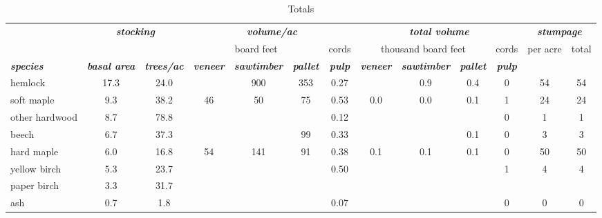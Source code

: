 \documentclass[landscape]{article}
\begin{document}
\begin{table}[H]

\caption{\label{tab:unnamed-chunk-37}Totals}
\fontsize{10}{12}\selectfont
\begin{tabular}[t]{lcccccccccccc}
\toprule
\multicolumn{1}{c}{\em{\textbf{ }}} & \multicolumn{2}{c}{\em{\textbf{stocking}}} & \multicolumn{4}{c}{\em{\textbf{volume/ac }}} & \multicolumn{4}{c}{\em{\textbf{total volume}}} & \multicolumn{2}{c}{\em{\textbf{stumpage}}} \\
\cmidrule(l{3pt}r{3pt}){2-3} \cmidrule(l{3pt}r{3pt}){4-7} \cmidrule(l{3pt}r{3pt}){8-11} \cmidrule(l{3pt}r{3pt}){12-13}
\multicolumn{3}{c}{ } & \multicolumn{3}{c}{board feet} & \multicolumn{1}{c}{cords} & \multicolumn{3}{c}{thousand board feet} & \multicolumn{1}{c}{cords} & \multicolumn{1}{c}{per acre} & \multicolumn{1}{c}{total} \\
\cmidrule(l{3pt}r{3pt}){4-6} \cmidrule(l{3pt}r{3pt}){7-7} \cmidrule(l{3pt}r{3pt}){8-10} \cmidrule(l{3pt}r{3pt}){11-11} \cmidrule(l{3pt}r{3pt}){12-12} \cmidrule(l{3pt}r{3pt}){13-13}
\rowcolor[HTML]{DCDCDC}  \em{\textbf{species}} & \em{\textbf{basal area}} & \em{\textbf{trees/ac}} & \em{\textbf{veneer}} & \em{\textbf{sawtimber}} & \em{\textbf{pallet}} & \em{\textbf{pulp}} & \em{\textbf{veneer}} & \em{\textbf{sawtimber}} & \em{\textbf{pallet}} & \em{\textbf{pulp}} & \em{\textbf{ }} & \em{\textbf{ }}\\
\midrule
\rowcolor{gray!6}  hemlock & 17.3 & 24.0 &  & 900 & 353 & 0.27 &  & 0.9 & 0.4 & 0 & 54 & 54\\
 
soft maple & 9.3 & 38.2 & 46 & 50 & 75 & 0.53 & 0.0 & 0.0 & 0.1 & 1 & 24 & 24\\
 
\rowcolor{gray!6}  other hardwood & 8.7 & 78.8 &  &  &  & 0.12 &  &  &  & 0 & 1 & 1\\
 
beech & 6.7 & 37.3 &  &  & 99 & 0.33 &  &  & 0.1 & 0 & 3 & 3\\
 
\rowcolor{gray!6}  hard maple & 6.0 & 16.8 & 54 & 141 & 91 & 0.38 & 0.1 & 0.1 & 0.1 & 0 & 50 & 50\\
 
yellow birch & 5.3 & 23.7 &  &  &  & 0.50 &  &  &  & 1 & 4 & 4\\
 
\rowcolor{gray!6}  paper birch & 3.3 & 31.7 &  &  &  &  &  &  &  &  &  & \\
 
ash & 0.7 & 1.8 &  &  &  & 0.07 &  &  &  & 0 & 0 & 0\\
 

\end{tabular}
\end{table}
\end{document}
